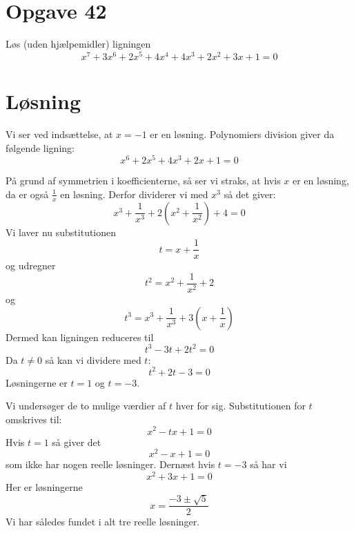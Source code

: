 \documentclass[12pt,oneside,a4paper]{article}
\begin{document}
\section{Opgave 42}
Løs (uden hjælpemidler) ligningen
$$
x^7+3x^6+2x^5+4x^4+4x^3+2x^2+3x+1=0
$$

\section{Løsning}
Vi ser ved indsættelse, at $x=-1$ er en løsning.
Polynomiers division giver da følgende ligning:
$$
x^6+2x^5+4x^3+2x+1=0
$$

På grund af symmetrien i koefficienterne, så ser vi straks, at hvis $x$ er en løsning, da er også $\frac 1x$ en løsning.
Derfor dividerer vi med $x^3$ så det giver:
$$
x^3+\frac {1}{x^3} + 2 \left(x^2+\frac{1}{x^2}\right) + 4 = 0
$$
Vi laver nu substitutionen
$$
t=x+\frac 1x
$$
og udregner
$$
t^2 = x^2+\frac{1}{x^2} + 2
$$
og
$$
t^3 = x^3+\frac {1}{x^3} + 3\left(x+\frac 1x\right)
$$
Dermed kan ligningen reduceres til
$$
t^3-3t+2t^2=0
$$
Da $t\neq 0$ så kan vi dividere med $t$:
$$
t^2+2t-3=0
$$
Løsningerne er $t=1$ og $t=-3$.

Vi undersøger de to mulige værdier af $t$ hver for sig. 
Substitutionen for $t$ omskrives til:
$$
x^2-tx+1=0
$$
Hvis $t=1$ så giver det
$$
x^2-x+1=0
$$
som ikke har nogen reelle løsninger.
Dernæst hvis $t=-3$ så har vi
$$
x^2+3x+1=0
$$
Her er løsningerne
$$
x=\frac{-3\pm\sqrt 5}{2}
$$
Vi har således fundet i alt tre reelle løsninger.
\end{document}
